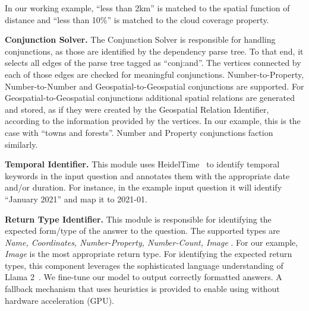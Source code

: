 In our working example, ``less than 2km'' is matched to the spatial function of distance and ``less than 10\%'' is matched to the cloud coverage property.

\textbf{Conjunction Solver.} The Conjunction Solver is responsible for handling conjunctions, as those are identified by the dependency parse tree. To that end, it selects all edges of the parse tree tagged as ``conj:and''. The vertices connected by each of those edges are checked for meaningful conjunctions. Number-to-Property, Number-to-Number and Geospatial-to-Geospatial conjunctions are supported.
For Geospatial-to-Geospatial conjunctions additional spatial relations are generated and stored, as if they were created by the Geospatial Relation Identifier, according to the information provided by the vertices. In our example, this is the case with ``towns and forests''. Number and Property conjunctions faction similarly.

\textbf{Temporal Identifier.} This module uses HeidelTime~\cite{heideltime} to identify temporal keywords in the input question and annotates them with the appropriate date and/or duration. For instance, in the example input question it will identify ``January 2021'' and map it to 2021-01. 


\textbf{Return Type Identifier.} This module is responsible for identifying the expected form/type of the answer to the question. The supported types are \textit{ Name, Coordinates, Number-Property, Number-Count, Image }. For our example, \textit{Image} is the most appropriate return type.
For identifying the expected return types, this component leverages the sophisticated language understanding of Llama 2~\cite{llama2}. We fine-tune our model to output correctly formatted answers. A fallback mechanism that uses heuristics is provided to enable using \EngineName{} without hardware acceleration (GPU).

